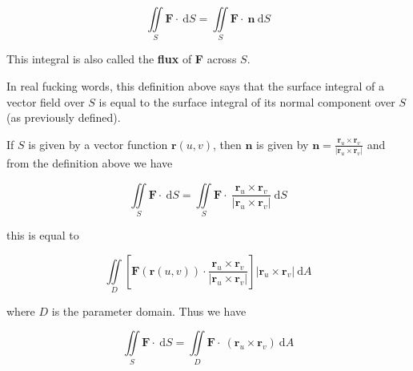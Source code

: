 \documentclass{article}
\begin{document}
\begin{equation*}
    \iint\limits_{S} \mathbf{F} \cdot \ \mathrm{d}S = \iint\limits_{S} \mathbf{F} \cdot \ \mathbf{n} \ \mathrm{d}S
\end{equation*}

This integral is also called the \textbf{flux} of \textbf{F} across $S$.

In real fucking words, this definition above says that the surface integral of a vector field over $S$ is equal to the surface integral of its normal component over $S$ (as previously defined). 

If $S$ is given by a vector function $\mathbf{r}(u,v)$, then $\mathbf{n}$ is given by $\mathbf{n} = \frac{\mathbf{r}_u \times \mathbf{r}_v}{\rvert \mathbf{r}_u \times \mathbf{r}_v \rvert}$ and from the definition above we have

\begin{equation*}
    \iint\limits_{S} \mathbf{F} \cdot \ \mathrm{d} S = \iint\limits_{S} \mathbf{F}  \cdot \ \frac{\mathbf{r}_u \times \mathbf{r}_v }{\rvert \mathbf{r}_u \times \mathbf{r}_v \rvert} \ \mathrm{d}S
\end{equation*}

this is equal to 

\begin{equation*}
    \iint\limits_{D} [\mathbf{F}(\mathbf{r}(u,v)) \cdot \frac{\mathbf{r}_u \times \mathbf{r}_v }{\rvert \mathbf{r}_u \times \mathbf{r}_v \rvert}] \rvert \mathbf{r}_u \times \mathbf{r}_v \rvert \ \mathrm{d}A
\end{equation*}

where $D$ is the parameter domain. Thus we have

\begin{equation*}
    \iint\limits_{S} \mathbf{F} \cdot \ \mathrm{d}S = \iint\limits_{D} \mathbf{F} \cdot \ (\mathbf{r}_u \times \mathbf{r}_v) \ \mathrm{d}A
\end{equation*}
\end{document}
